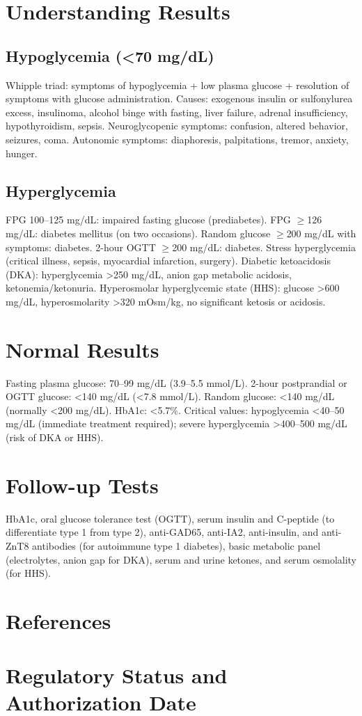 \section*{Understanding Results}
\subsection*{Hypoglycemia (<70 mg/dL)}
Whipple triad: symptoms of hypoglycemia + low plasma glucose + resolution of symptoms with glucose administration. Causes: exogenous insulin or sulfonylurea excess, insulinoma, alcohol binge with fasting, liver failure, adrenal insufficiency, hypothyroidism, sepsis. Neuroglycopenic symptoms: confusion, altered behavior, seizures, coma. Autonomic symptoms: diaphoresis, palpitations, tremor, anxiety, hunger.
\subsection*{Hyperglycemia}
FPG 100--125 mg/dL: impaired fasting glucose (prediabetes). FPG $\geq$126 mg/dL: diabetes mellitus (on two occasions). Random glucose $\geq$200 mg/dL with symptoms: diabetes. 2-hour OGTT $\geq$200 mg/dL: diabetes. Stress hyperglycemia (critical illness, sepsis, myocardial infarction, surgery). Diabetic ketoacidosis (DKA): hyperglycemia >250 mg/dL, anion gap metabolic acidosis, ketonemia/ketonuria. Hyperosmolar hyperglycemic state (HHS): glucose >600 mg/dL, hyperosmolarity >320 mOsm/kg, no significant ketosis or acidosis.
\section*{Normal Results}
Fasting plasma glucose: 70--99 mg/dL (3.9--5.5 mmol/L). 2-hour postprandial or OGTT glucose: <140 mg/dL (<7.8 mmol/L). Random glucose: <140 mg/dL (normally <200 mg/dL). HbA1c: <5.7\%. Critical values: hypoglycemia <40--50 mg/dL (immediate treatment required); severe hyperglycemia >400--500 mg/dL (risk of DKA or HHS).
\section*{Follow-up Tests}
HbA1c, oral glucose tolerance test (OGTT), serum insulin and C-peptide (to differentiate type 1 from type 2), anti-GAD65, anti-IA2, anti-insulin, and anti-ZnT8 antibodies (for autoimmune type 1 diabetes), basic metabolic panel (electrolytes, anion gap for DKA), serum and urine ketones, and serum osmolality (for HHS).
\section*{References}


\clearpage
\section*{Regulatory Status and Authorization Date}

\clearpage
